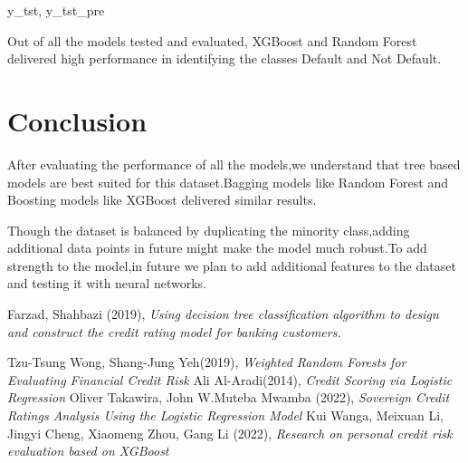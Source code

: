 y_tst, y_tst_pre\documentclass[12pt]{article}
\begin{document}
Out of all the models tested and evaluated, XGBoost and Random Forest delivered high performance in identifying the classes Default and Not Default.



\pagebreak
\section{Conclusion}
After evaluating the performance of all the models,we understand that tree based models are best suited for this dataset.Bagging models like Random Forest and Boosting models like XGBoost delivered similar results.

Though the dataset is balanced by duplicating the minority class,adding additional data points in future might make the model much robust.To add strength to the model,in future we plan to add additional features to the dataset and testing it with neural networks.

\begin{thebibliography}{}


\bibitem{}
Farzad, Shahbazi (2019), \emph{ Using decision tree classification algorithm to design and construct the credit rating model for banking customers.}

Tzu-Tsung Wong, Shang-Jung Yeh(2019), \emph{Weighted Random Forests for Evaluating Financial Credit Risk}
Ali Al-Aradi(2014), \emph{Credit Scoring via Logistic Regression}
Oliver Takawira, John W.Muteba Mwamba (2022), \emph{Sovereign Credit Ratings Analysis Using the Logistic Regression Model}
Kui Wanga, Meixuan Li, Jingyi Cheng, Xiaomeng Zhou, Gang Li (2022), \emph{Research on personal credit risk evaluation based on XGBoost}

\end{thebibliography}
\end{document}
